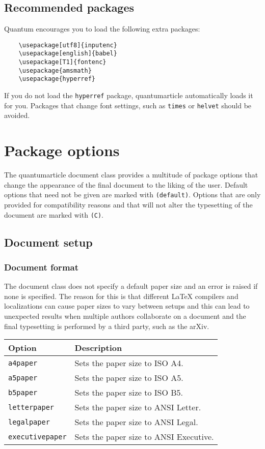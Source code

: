 \documentclass[a4paper,noarxiv,onecolumn]{quantumarticle}
\newenvironment{options}
	{\medskip\noindent\begin{longtable}{p{.25\columnwidth}p{.694\columnwidth}}
	\textsf{Option} & \textsf{Description} \\
	\midrule
	}
	{\bottomrule\end{longtable}}
\newcommand{\option}[2]{
	\small\texttt{#1} & {\small#2} \\
}
\begin{document}
	\subsection{Recommended packages}
	Quantum encourages you to load the following extra packages:
	\begin{verbatim}
	\usepackage[utf8]{inputenc}
	\usepackage[english]{babel}
	\usepackage[T1]{fontenc}
	\usepackage{amsmath}
	\usepackage{hyperref}
	\end{verbatim}
	If you do not load the \texttt{hyperref} package, quantumarticle automatically loads it for you.
	Packages that change font settings, such as \texttt{times} or \texttt{helvet} should be avoided.
	
	\section{Package options}
        \label{sec:options}
	The quantumarticle document class provides a multitude of package options that change the appearance of the final document to the liking of the user. Default options that need not be given are marked with \texttt{(default)}. Options that are only provided for compatibility reasons and that will not alter the typesetting of the document are marked with \texttt{(C)}.
	
	\subsection{Document setup}
	
	\subsubsection{Document format}
	The document class does not specify a default paper size and an error is raised if none is specified. The reason for this is that different LaTeX compilers and localizations can cause paper sizes to vary between setups and this can lead to unexpected results when multiple authors collaborate on a document and the final typesetting is performed by a third party, such as the arXiv.   
	
	\begin{options}
		\option{a4paper}{%
			Sets the paper size to ISO A4.
		}
		\option{a5paper}{%
			Sets the paper size to ISO A5.
		}
		\option{b5paper}{%
			Sets the paper size to ISO B5.
		}
		\option{letterpaper}{%
			Sets the paper size to ANSI Letter.
		}
		\option{legalpaper}{%
			Sets the paper size to ANSI Legal.
		}
		\option{executivepaper}{%
			Sets the paper size to ANSI Executive.
		}
	\end{options}
\end{document}

